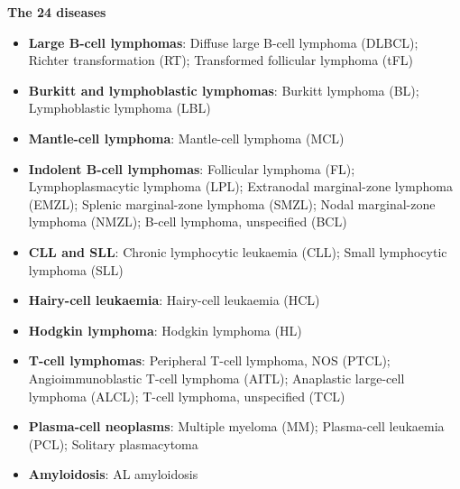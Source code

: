 \documentclass[10pt,a4paper]{article}
\begin{document}
\begin{Form}
\newpage
{\large\bfseries The 24 diseases}\par
\begin{itemize}[leftmargin=0pt,itemsep=2pt,topsep=2pt]
\item[] \textbf{Large B-cell lymphomas}: Diffuse large B-cell lymphoma (DLBCL); Richter transformation (RT); Transformed follicular lymphoma (tFL)
\item[] \textbf{Burkitt and lymphoblastic lymphomas}: Burkitt lymphoma (BL); Lymphoblastic lymphoma (LBL)
\item[] \textbf{Mantle-cell lymphoma}: Mantle-cell lymphoma (MCL)
\item[] \textbf{Indolent B-cell lymphomas}: Follicular lymphoma (FL); Lymphoplasmacytic lymphoma (LPL); Extranodal marginal-zone lymphoma (EMZL); Splenic marginal-zone lymphoma (SMZL); Nodal marginal-zone lymphoma (NMZL); B-cell lymphoma, unspecified (BCL)
\item[] \textbf{CLL and SLL}: Chronic lymphocytic leukaemia (CLL); Small lymphocytic lymphoma (SLL)
\item[] \textbf{Hairy-cell leukaemia}: Hairy-cell leukaemia (HCL)
\item[] \textbf{Hodgkin lymphoma}: Hodgkin lymphoma (HL)
\item[] \textbf{T-cell lymphomas}: Peripheral T-cell lymphoma, NOS (PTCL); Angioimmunoblastic T-cell lymphoma (AITL); Anaplastic large-cell lymphoma (ALCL); T-cell lymphoma, unspecified (TCL)
\item[] \textbf{Plasma-cell neoplasms}: Multiple myeloma (MM); Plasma-cell leukaemia (PCL); Solitary plasmacytoma
\item[] \textbf{Amyloidosis}: AL amyloidosis
\end{itemize}


\end{Form}
\end{document}
